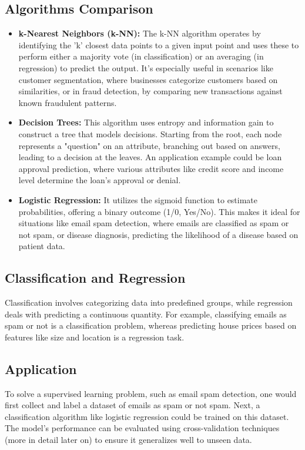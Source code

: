 \documentclass[11pt, a4paper]{article}
\begin{document}
\subsection{Algorithms Comparison}
\begin{itemize}
    
\item \textbf{k-Nearest Neighbors (k-NN):} The k-NN algorithm operates by identifying the 'k' closest data points to a given input point and uses these to perform either a majority vote (in classification) or an averaging (in regression) to predict the output. It's especially useful in scenarios like customer segmentation, where businesses categorize customers based on similarities, or in fraud detection, by comparing new transactions against known fraudulent patterns.

\item \textbf{Decision Trees:} This algorithm uses entropy and information gain to construct a tree that models decisions. Starting from the root, each node represents a "question" on an attribute, branching out based on answers, leading to a decision at the leaves. An application example could be loan approval prediction, where various attributes like credit score and income level determine the loan's approval or denial.

\item \textbf{Logistic Regression:} It utilizes the sigmoid function to estimate probabilities, offering a binary outcome (1/0, Yes/No). This makes it ideal for situations like email spam detection, where emails are classified as spam or not spam, or disease diagnosis, predicting the likelihood of a disease based on patient data.
\end{itemize}

\subsection{Classification and Regression}
Classification involves categorizing data into predefined groups, while regression deals with predicting a continuous quantity. For example, classifying emails as spam or not is a classification problem, whereas predicting house prices based on features like size and location is a regression task.

\subsection{Application}
To solve a supervised learning problem, such as email spam detection, one would first collect and label a dataset of emails as spam or not spam. Next, a classification algorithm like logistic regression could be trained on this dataset. The model's performance can be evaluated using cross-validation techniques (more in detail later on) to ensure it generalizes well to unseen data.
\end{document}
